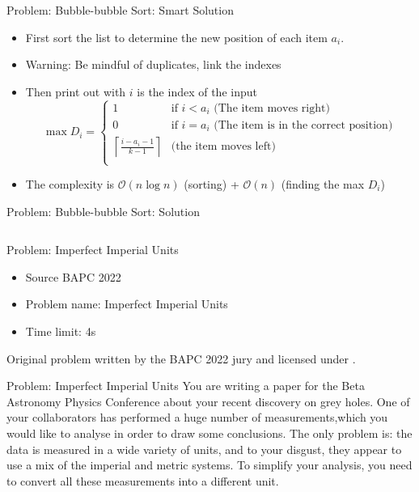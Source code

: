\documentclass[11pt,pdf, aspectratio=169]{beamer}
\begin{document}
  \begin{frame}{Problem: Bubble-bubble Sort: Smart Solution}
    \begin{itemize}
      \item<1-> First sort the list to determine the new position of each item $a_i$.
      \item<1-> Warning: Be mindful of duplicates, link the indexes
      \item<2-> Then print out with $i$ is the index of the input
      \[\max D_i = \begin{cases}
                     1 & \text{if } i < a_i \text{ (The item moves right)}\\
                     0 & \text{if } i = a_i \text{ (The item is in the correct position)}\\
                     \left\lceil\frac{i-a_i - 1}{k-1}\right\rceil & \text{(the item moves left)} \\
      \end{cases}\]
      \item<3-> The complexity is $\mathcal{O}(n\log{}n)$ (sorting) + $\mathcal{O}(n)$ (finding the max $D_i$)
    \end{itemize}
  \end{frame}
  \begin{frame}[containsverbatim]{ Problem: Bubble-bubble Sort: Solution}
    \inputminted{python}{code/session-1/python/dapc-b.py}
  \end{frame}
  \begin{frame}{Problem: Imperfect Imperial Units}
    \begin{itemize}
      \item Source BAPC 2022
      \item Problem name: Imperfect Imperial Units
      \item Time limit: 4s
    \end{itemize}
    Original problem written by the BAPC 2022 jury and licensed under \doclicenseLongNameRef.

    \doclicenseImage
  \end{frame}
  \begin{frame}{Problem: Imperfect Imperial Units}
    You are writing a paper for the Beta Astronomy Physics Conference about your recent discovery on grey holes.
    One of your collaborators has performed a huge number of measurements,which you would like to analyse in order to draw some conclusions.
    The only problem is: the data is measured in a wide variety of units, and to your disgust, they appear to use a mix of the imperial and metric systems.
    To simplify your analysis, you need to convert all these measurements into a different unit.
  \end{frame}
\end{document}
